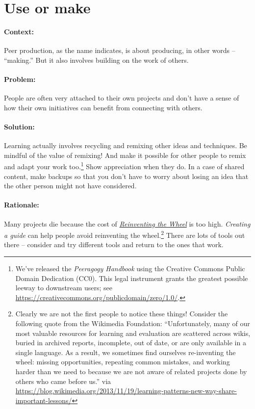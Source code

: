 \section{Use or make}
\paragraph{Context:}
Peer production, as the name indicates, is about producing, in other words --
``making.'' But it also involves building on the work of others.

\paragraph{Problem:}
People are often very attached to their own projects and don't have a sense of how their own initiatives can benefit from connecting with others.

\paragraph{Solution:} Learning actually involves recycling and remixing other ideas and techniques. Be mindful of the value of remixing!  And make it possible for other people to remix and adapt your work too.\footnote{We've released the \emph{Peeragogy Handbook} using the Creative Commons Public Domain Dedication (CC0).  This legal instrument grants the greatest possible leeway to downstream users; see \url{https://creativecommons.org/publicdomain/zero/1.0/}.}  Show appreciation when they do.  In a case of shared content, make backups so that you don't have to worry about losing an idea that the other person might not have considered.

\paragraph{Rationale:} 
Many projects die because the cost of \emph{\href{http://c2.com/cgi/wiki?ReinventingTheWheel}{Reinventing the Wheel}} is too high.  \emph{Creating a guide} can help people avoid reinventing the wheel.\footnote{Clearly we are not the first people to notice these things!  Consider the following quote from the Wikimedia Foundation: ``Unfortunately, many of our most valuable resources for learning and evaluation are scattered across wikis, buried in archived reports, incomplete, out of date, or are only available in a single language. As a result, we sometimes find ourselves re-inventing the wheel: missing opportunities, repeating common mistakes, and working harder than we need to because we are not aware of related projects done by others who came before us.'' via \url{https://blog.wikimedia.org/2013/11/19/learning-patterns-new-way-share-important-lessons/}}  There are lots of tools out there -- consider and try different tools and return to the ones that work.

